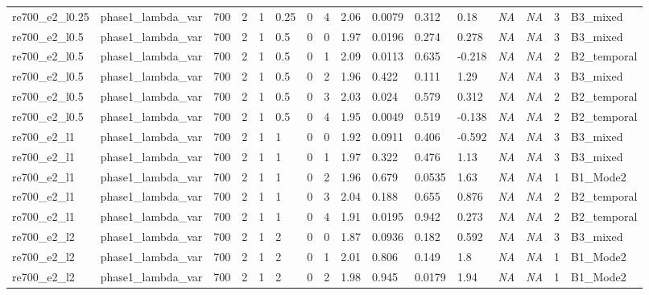 \documentclass[11pt,a4paper]{article}
\begin{document}
\begin{landscape}
\begin{longtable}{*{16}{l}}
    re700\_e2\_l0.25 & phase1\_lambda\_var & 700 & 2 & 1 & 0.25 & 0 & 4 & 2.06 & 0.0079 & 0.312 & 0.18 & \textit{NA} & \textit{NA} & 3 & B3\_mixed \\
    re700\_e2\_l0.5 & phase1\_lambda\_var & 700 & 2 & 1 & 0.5 & 0 & 0 & 1.97 & 0.0196 & 0.274 & 0.278 & \textit{NA} & \textit{NA} & 3 & B3\_mixed \\
    re700\_e2\_l0.5 & phase1\_lambda\_var & 700 & 2 & 1 & 0.5 & 0 & 1 & 2.09 & 0.0113 & 0.635 & -0.218 & \textit{NA} & \textit{NA} & 2 & B2\_temporal \\
    re700\_e2\_l0.5 & phase1\_lambda\_var & 700 & 2 & 1 & 0.5 & 0 & 2 & 1.96 & 0.422 & 0.111 & 1.29 & \textit{NA} & \textit{NA} & 3 & B3\_mixed \\
    re700\_e2\_l0.5 & phase1\_lambda\_var & 700 & 2 & 1 & 0.5 & 0 & 3 & 2.03 & 0.024 & 0.579 & 0.312 & \textit{NA} & \textit{NA} & 2 & B2\_temporal \\
    re700\_e2\_l0.5 & phase1\_lambda\_var & 700 & 2 & 1 & 0.5 & 0 & 4 & 1.95 & 0.0049 & 0.519 & -0.138 & \textit{NA} & \textit{NA} & 2 & B2\_temporal \\
    re700\_e2\_l1 & phase1\_lambda\_var & 700 & 2 & 1 & 1 & 0 & 0 & 1.92 & 0.0911 & 0.406 & -0.592 & \textit{NA} & \textit{NA} & 3 & B3\_mixed \\
    re700\_e2\_l1 & phase1\_lambda\_var & 700 & 2 & 1 & 1 & 0 & 1 & 1.97 & 0.322 & 0.476 & 1.13 & \textit{NA} & \textit{NA} & 3 & B3\_mixed \\
    re700\_e2\_l1 & phase1\_lambda\_var & 700 & 2 & 1 & 1 & 0 & 2 & 1.96 & 0.679 & 0.0535 & 1.63 & \textit{NA} & \textit{NA} & 1 & B1\_Mode2 \\
    re700\_e2\_l1 & phase1\_lambda\_var & 700 & 2 & 1 & 1 & 0 & 3 & 2.04 & 0.188 & 0.655 & 0.876 & \textit{NA} & \textit{NA} & 2 & B2\_temporal \\
    re700\_e2\_l1 & phase1\_lambda\_var & 700 & 2 & 1 & 1 & 0 & 4 & 1.91 & 0.0195 & 0.942 & 0.273 & \textit{NA} & \textit{NA} & 2 & B2\_temporal \\
    re700\_e2\_l2 & phase1\_lambda\_var & 700 & 2 & 1 & 2 & 0 & 0 & 1.87 & 0.0936 & 0.182 & 0.592 & \textit{NA} & \textit{NA} & 3 & B3\_mixed \\
    re700\_e2\_l2 & phase1\_lambda\_var & 700 & 2 & 1 & 2 & 0 & 1 & 2.01 & 0.806 & 0.149 & 1.8 & \textit{NA} & \textit{NA} & 1 & B1\_Mode2 \\
    re700\_e2\_l2 & phase1\_lambda\_var & 700 & 2 & 1 & 2 & 0 & 2 & 1.98 & 0.945 & 0.0179 & 1.94 & \textit{NA} & \textit{NA} & 1 & B1\_Mode2 \\

\end{longtable}
\end{landscape}
\end{document}
